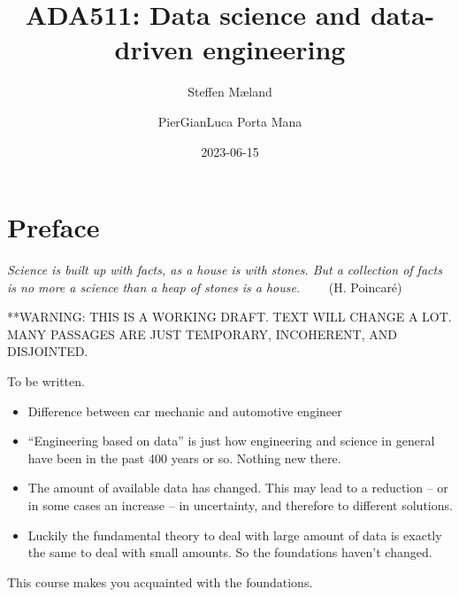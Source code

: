 \documentclass[
  a4paper,
  DIV=11,
  numbers=noendperiod,
  oneside]{scrreprt}
\title{ADA511: Data science and data-driven engineering}
\author{Steffen Mæland \and PierGianLuca Porta Mana}
\date{2023-06-15}
\renewcommand*\contentsname{Table of contents}
\newcommand\contentsname{Table of contents}
\begin{document}
\maketitle
\ifdefined\Shaded\renewenvironment{Shaded}{\begin{tcolorbox}[interior hidden, breakable, boxrule=0pt, borderline west={3pt}{0pt}{shadecolor}, frame hidden, enhanced, sharp corners]}{\end{tcolorbox}}\fi

\renewcommand*\contentsname{Table of contents}
{
\hypersetup{linkcolor=}
\setcounter{tocdepth}{2}
\tableofcontents
}

\hypertarget{preface}{%
\chapter*{Preface}\label{preface}}


\hfill\break
\hfill\break
\hfill\break
\hfill\break
\hfill\break
\hfill\break

\emph{Science is built up with facts, as a house is with stones. But a
collection of facts is no more a science than a heap of stones is a
house.} ~~~~{(H. Poincaré)}

**WARNING: THIS IS A WORKING DRAFT. TEXT WILL CHANGE A LOT. MANY
PASSAGES ARE JUST TEMPORARY, INCOHERENT, AND DISJOINTED.

To be written.

\begin{itemize}
\item
  Difference between car mechanic and automotive engineer
\item
  ``Engineering based on data'' is just how engineering and science in
  general have been in the past 400 years or so. Nothing new there.
\item
  The amount of available data has changed. This may lead to a reduction
  -- or in some cases an increase -- in uncertainty, and therefore to
  different solutions.
\item
  Luckily the fundamental theory to deal with large amount of data is
  exactly the same to deal with small amounts. So the foundations
  haven't changed.
\end{itemize}

This course makes you acquainted with the foundations.

\end{document}
